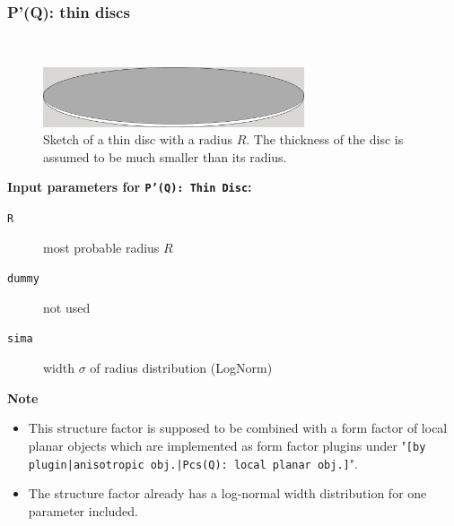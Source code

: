 \subsubsection{P'(Q): thin discs} ~\\
\label{plugin:Pprime4Discs}

\begin{figure}[htb]
\begin{center}
\includegraphics[width=0.686\textwidth,height=0.27\textwidth]{../images/form_factor/anisotropic/ThinDisc.png}
\end{center}
\caption{Sketch of a thin disc with a radius $R$. The thickness of the disc is assumed to be much smaller than its radius.}
\label{fig:ThinDisc}
\end{figure}

\noindent
\textbf{Input parameters for \texttt{P'(Q): Thin Disc}:}
\begin{description}
    \item[\texttt{R}] most probable radius $R$
    \item[\texttt{dummy}] not used
    \item[\texttt{sima}] width $\sigma$ of radius distribution (LogNorm)
\end{description}

\noindent
\textbf{Note}
\begin{itemize}
  \item This structure factor is supposed to be combined with a form factor of local planar objects which are implemented as form factor plugins
under "\texttt{[by plugin|anisotropic obj.|Pcs(Q): local planar obj.]}".
\item The structure factor already has a log-normal width distribution for one parameter included.
\end{itemize}

